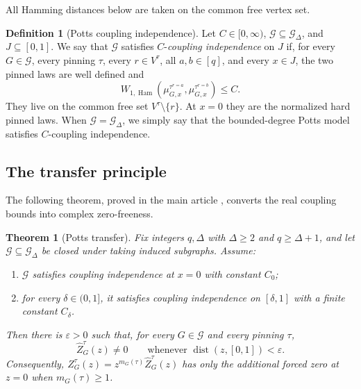 \documentclass[11pt,reqno]{article}
\theoremstyle{plain}
\newtheorem{theorem}{Theorem}[section]
\theoremstyle{definition}
\newtheorem{definition}[definition]{Definition}
\theoremstyle{remark}
\newcommand{\eps}{\varepsilon}
\newcommand{\dist}{\operatorname{dist}}
\DeclareMathOperator{\Ham}{Ham}
\newcommand{\Deg}{\Delta}                        %
\newcommand{\WHam}{W_{1,\Ham}}                   %
\newcommand{\colours}{[q]}                        %
\newcommand{\Gdeg}{\mathcal{G}_{\Deg}}
\newcommand{\Zpin}[2]{Z_{#1}^{#2}}
\newcommand{\nZpin}[2]{\widehat Z_{#1}^{#2}}
\newcommand{\mupin}[3]{\mu_{#1,#3}^{#2}}
\begin{document}
All Hamming distances below are taken on the common free vertex set.

\begin{definition}[Potts coupling independence]\label{def:potts-ci}
Let \(C\in[0,\infty)\), \(\mathcal G\subseteq\Gdeg\), and
\(J\subseteq[0,1]\).  We say that
\(\mathcal G\) satisfies \(C\)-\emph{coupling independence} on \(J\) if,
for every \(G\in\mathcal G\), every pinning \(\tau\), every
\(r\in V^\tau\), all \(a,b\in\colours\), and every \(x\in J\), the two
pinned laws are well defined and
\begin{equation}\label{eq:potts-ci}
  \WHam\!\left(
    \mupin{G}{\tau^{r=a}}{x},
    \mupin{G}{\tau^{r=b}}{x}
  \right)\le C.
\end{equation}
They live on the common free set \(V^\tau\setminus\{r\}\).  At \(x=0\)
they are the normalized hard pinned laws.  When
\(\mathcal G=\Gdeg\), we simply say that the bounded-degree Potts model
satisfies \(C\)-coupling independence.
\end{definition}

\subsection{The transfer principle}

The following theorem, proved in the main article
\cite{ShaoShi2026CI2ZF}, converts the real coupling bounds into complex
zero-freeness.

\begin{theorem}[Potts transfer]
\label{thm:potts-transfer}
Fix integers \(q,\Deg\) with \(\Deg\ge2\) and \(q\ge\Deg+1\), and let
\(\mathcal G\subseteq\Gdeg\) be closed under taking induced subgraphs.  Assume:
\begin{enumerate}[label=\textup{(\roman*)}]
  \item \(\mathcal G\) satisfies coupling independence at \(x=0\) with
        constant \(C_0\);
  \item for every \(\delta\in(0,1]\), it satisfies coupling independence
        on \([\delta,1]\) with a finite constant \(C_\delta\).
\end{enumerate}
Then there is \(\eps>0\) such that, for every \(G\in\mathcal G\) and every
pinning \(\tau\),
\[
  \nZpin{G}{\tau}(z)\ne0
  \qquad\text{whenever }\dist(z,[0,1])<\eps.
\]
Consequently,
\(\Zpin{G}{\tau}(z)=z^{m_G(\tau)}\nZpin{G}{\tau}(z)\) has only the
additional forced zero at \(z=0\) when \(m_G(\tau)\ge1\).
\end{theorem}
\end{document}

